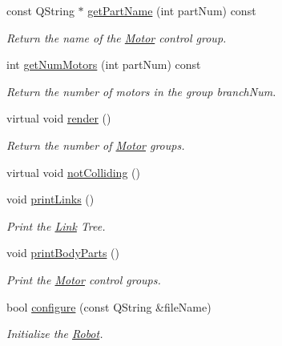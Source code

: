 \begin{DoxyCompactItemize}
const QString $\ast$ \hyperlink{class_robot_model_1_1_robot_a3fb8fb4e1d19bdf1c4c9278d2e9bcd31}{getPartName} (int partNum) const 
\begin{DoxyCompactList}\small\item\em Return the name of the \hyperlink{class_robot_model_1_1_motor}{Motor} control group. \item\end{DoxyCompactList}\item 
int \hyperlink{class_robot_model_1_1_robot_aae3de10ec98969b5def3adc436483362}{getNumMotors} (int partNum) const 
\begin{DoxyCompactList}\small\item\em Return the number of motors in the group branchNum. \item\end{DoxyCompactList}\item 
virtual void \hyperlink{class_robot_model_1_1_robot_a3be7d3c8d21aeb68633d9e176a3fbf08}{render} ()
\begin{DoxyCompactList}\small\item\em Return the number of \hyperlink{class_robot_model_1_1_motor}{Motor} groups. \item\end{DoxyCompactList}\item 
virtual void \hyperlink{class_robot_model_1_1_robot_a355a98d015e6aad905e4d2e5cf42c442}{notColliding} ()
\item 
void \hyperlink{class_robot_model_1_1_robot_a064e5fce550bb3427fb36c2f43e34000}{printLinks} ()
\begin{DoxyCompactList}\small\item\em Print the \hyperlink{class_robot_model_1_1_link}{Link} Tree. \item\end{DoxyCompactList}\item 
void \hyperlink{class_robot_model_1_1_robot_abb43fb469172e7ff9ce37a7211a81175}{printBodyParts} ()
\begin{DoxyCompactList}\small\item\em Print the \hyperlink{class_robot_model_1_1_motor}{Motor} control groups. \item\end{DoxyCompactList}\item 
bool \hyperlink{class_robot_model_1_1_robot_af54a14845b7e3ee6c4103790df71568e}{configure} (const QString \&fileName)
\begin{DoxyCompactList}\small\item\em Initialize the \hyperlink{class_robot_model_1_1_robot}{Robot}. \item\end{DoxyCompactList}\item 

\end{DoxyCompactItemize}

